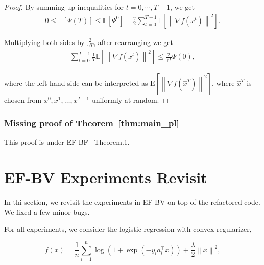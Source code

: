 \documentclass{article} %
\newcommand{\algname}[1]{{\sf\green\relscale{0.90}#1}\xspace}
\newcommand{\eqdef}{\coloneqq}
\theoremstyle{plain}
\theoremstyle{definition}
\theoremstyle{remark}
\newcommand{\green}{\color{mydarkgreen}}
\newcommand{\sqnorm}[1]{\left\| #1 \right\|^2}
\newcommand{\Exp}[1]{\mathbb{E}\!\left[ #1 \right]}
\begin{document}
\begin{proof}
   By summing up inequalities for $t=0, \cdots, T-1$, we get 
   \begin{align*}
      0 \leq \Exp{\Psi(T)} \leq \Exp{\Psi^0} - \frac{\gamma}{2} \sum_{t=0}^{T-1} \Exp{\sqnorm{\nabla f(x^t)}}.
   \end{align*}

   Multiplying both sides by $\frac{2}{\gamma T}$, after rearranging we get
   \begin{align*}
      \sum_{t=0}^{T-1} \frac{1}{T}\Exp{\sqnorm{\nabla f(x^t)}} \leq \frac{2}{\gamma T} \Psi(0),
   \end{align*}

   where the left hand side can be interpreted as $\mathrm{E}\left[\left\|\nabla f\left(\hat{x}^{T}\right)\right\|^{2}\right]$, where $\hat{x}^{T}$ is chosen from $x^{0}, x^{1}, \ldots, x^{T-1}$ uniformly at random.

   \end{proof}

   \subsubsection{Missing proof of Theorem~\ref{thm:main_pl}}
   This proof is under \algname{EF-BF}~\cite{condat2022ef} Theorem.1. 

   \section{EF-BV Experiments Revisit}
   In thi section, we revisit the experiments in \algname{EF-BV} on top of the refactored code. We fixed a few minor bugs.

   For all experiments, we consider the logistic regression with convex regularizer, 

   \begin{equation}
      f(x)=\frac{1}{n} \sum_{i=1}^{n} \log \left(1+\exp \left(-y_{i} a_{i}^{\top} x\right)\right)+ \frac{\lambda}{2}\sqnorm{x},
   \end{equation}
   
\end{document}
